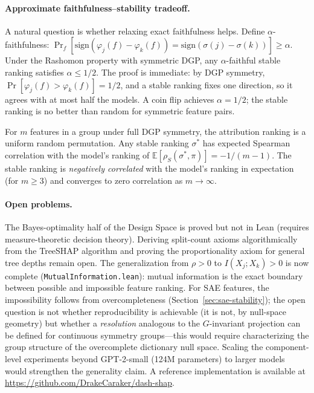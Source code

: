 \documentclass{article}
\newcommand{\E}{\mathbb{E}}
\begin{document}
\paragraph{Approximate faithfulness--stability tradeoff.}
A natural question is whether relaxing exact faithfulness helps. Define $\alpha$-faithfulness: $\Pr_f[\text{sign}(\varphi_j(f) - \varphi_k(f)) = \text{sign}(\sigma(j) - \sigma(k))] \geq \alpha$. Under the Rashomon property with symmetric DGP, any $\alpha$-faithful stable ranking satisfies $\alpha \leq 1/2$. The proof is immediate: by DGP symmetry, $\Pr[\varphi_j(f) > \varphi_k(f)] = 1/2$, and a stable ranking fixes one direction, so it agrees with at most half the models. A coin flip achieves $\alpha = 1/2$; the stable ranking is no better than random for symmetric feature pairs.

For $m$ features in a group under full DGP symmetry, the attribution ranking is a uniform random permutation. Any stable ranking $\sigma^*$ has expected Spearman correlation with the model's ranking of $\E[\rho_S(\sigma^*, \pi)] = -1/(m-1)$. The stable ranking is \emph{negatively correlated} with the model's ranking in expectation (for $m \geq 3$) and converges to zero correlation as $m \to \infty$.

\paragraph{Open problems.}
The Bayes-optimality half of the Design Space is proved but not in Lean (requires measure-theoretic decision theory). Deriving split-count axioms algorithmically from the TreeSHAP algorithm and proving the proportionality axiom for general tree depths remain open. The generalization from $\rho > 0$ to $I(X_j; X_k) > 0$ is now complete (\texttt{MutualInformation.lean}): mutual information is the exact boundary between possible and impossible feature ranking. For SAE features, the impossibility follows from overcompleteness (Section~\ref{sec:sae-stability}); the open question is not whether reproducibility is achievable (it is not, by null-space geometry) but whether a \emph{resolution} analogous to the $G$-invariant projection can be defined for continuous symmetry groups---this would require characterizing the group structure of the overcomplete dictionary null space. Scaling the component-level experiments beyond GPT-2-small (124M parameters) to larger models would strengthen the generality claim. A reference implementation is available at \url{https://github.com/DrakeCaraker/dash-shap}.
\end{document}
